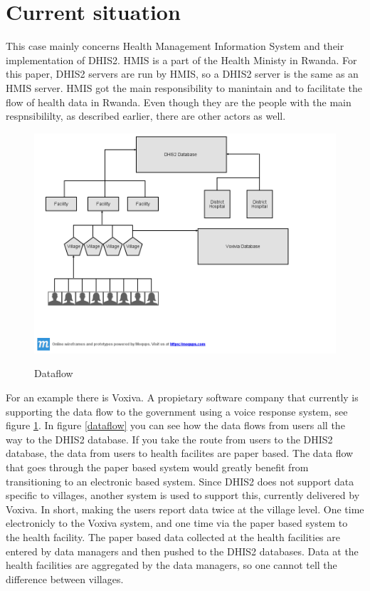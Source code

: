 \section{Current situation}
This case mainly concerns Health Management Information System and their implementation of DHIS2. HMIS is a part of the Health Ministy in Rwanda. For this paper, DHIS2 servers are run by HMIS, so a DHIS2 server is the same as an HMIS server. 
HMIS got the main responsibility to manintain and to facilitate the flow of health data in Rwanda. Even though they are the people with the main respnsibililty, as described earlier, there are other actors as well.
\begin{figure}
\centering
\includegraphics[width=12cm]{empirical/images/dataflow}
\label{fig:dataflow}
\caption{Dataflow}
\end{figure}
For an example there is Voxiva. A propietary software company that currently is supporting the data flow to the government using a voice response system, see figure \ref{fig:dataflow}. 
In figure \ref{dataflow} you can see how the data flows from users all the way to the DHIS2 database. If you take the route from users to the DHIS2 database, the data from users to health facilites are paper based.
The data flow that goes through the paper based system would greatly benefit from transitioning to an electronic based system.
Since DHIS2 does not support data specific to villages, another system is used to support this, currently delivered by Voxiva.
In short, making the users report data twice at the village level. One time electronicly to the Voxiva system, and one time via the paper based system to the health facility.
The paper based data collected at the health facilities are entered by data managers and then pushed to the DHIS2 databases. Data at the health facilities are aggregated by the data managers, so one cannot tell the difference between villages. 

